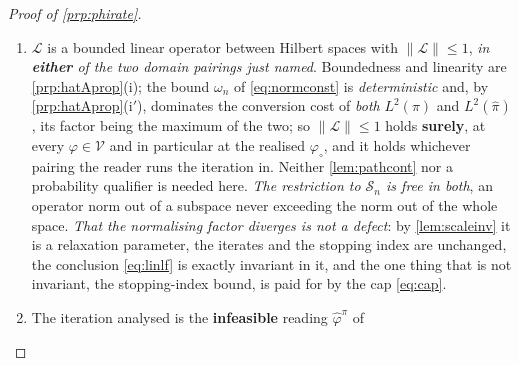 \begin{proof}[Proof of \cref{prp:phirate}]
\begin{enumerate}
\item[(L1)] $\mathcal L$ is a bounded linear operator between Hilbert spaces with
$\|\mathcal L\|\le1$, \emph{in \textbf{either} of the two domain pairings just named}. Boundedness and
linearity are \cref{prp:hatAprop}(i); the bound $\omega_n$ of \eqref{eq:normconst} is
\emph{deterministic} and, by \cref{prp:hatAprop}(i$'$), dominates the conversion cost of \emph{both}
$L^{2}(\pi)$ and $L^{2}(\hat\pi)$, its factor being the maximum of the two; so
$\|\mathcal L\|\le1$ holds \textbf{surely}, at every
$\varphi\in\mathcal V$ and in particular at the realised $\varphi_\circ$, and it holds whichever pairing
the reader runs the iteration in. Neither
\cref{lem:pathcont} nor a probability qualifier is needed here. \emph{The restriction to $\mathcal S_n$
is free in both}, an operator norm out of a subspace never exceeding the norm out of the whole space.
\emph{That the normalising factor
diverges is not a defect}: by \cref{lem:scaleinv} it is a relaxation parameter, the iterates and the
stopping index are unchanged, the conclusion \eqref{eq:linlf} is exactly invariant in it, and the one
thing that is not invariant, the stopping-index bound, is paid for by the cap \eqref{eq:cap}.
\item[(L2)] The iteration analysed is the \textbf{infeasible} reading $\hat\varphi^{\pi}$ of

\end{enumerate}
\end{proof}
